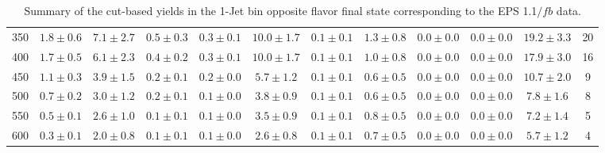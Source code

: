 \begin{table}[!hb]
{\begin{center}
\begin{tabular}{l c c c c c c c c c c c }
350 & $1.8\pm0.6$ & $7.1\pm2.7$ & $0.5\pm0.3$ & $0.3\pm0.1$ & $10.0\pm1.7$ & $0.1\pm0.1$ & $1.3\pm0.8$ & $0.0\pm0.0$ & $0.0\pm0.0$ & $19.2\pm3.3$ & 20 \\
400 & $1.7\pm0.5$ & $6.1\pm2.3$ & $0.4\pm0.2$ & $0.3\pm0.1$ & $10.0\pm1.7$ & $0.1\pm0.1$ & $1.0\pm0.8$ & $0.0\pm0.0$ & $0.0\pm0.0$ & $17.9\pm3.0$ & 16 \\
450 & $1.1\pm0.3$ & $3.9\pm1.5$ & $0.2\pm0.1$ & $0.2\pm0.0$ & $5.7\pm1.2$ & $0.1\pm0.1$ & $0.6\pm0.5$ & $0.0\pm0.0$ & $0.0\pm0.0$ & $10.7\pm2.0$ & 9 \\
500 & $0.7\pm0.2$ & $3.0\pm1.2$ & $0.2\pm0.1$ & $0.1\pm0.0$ & $3.8\pm0.9$ & $0.1\pm0.1$ & $0.6\pm0.5$ & $0.0\pm0.0$ & $0.0\pm0.0$ & $7.8\pm1.6$ & 8 \\
550 & $0.5\pm0.1$ & $2.6\pm1.0$ & $0.1\pm0.1$ & $0.1\pm0.0$ & $3.5\pm0.9$ & $0.1\pm0.1$ & $0.8\pm0.5$ & $0.0\pm0.0$ & $0.0\pm0.0$ & $7.2\pm1.4$ & 5 \\
600 & $0.3\pm0.1$ & $2.0\pm0.8$ & $0.1\pm0.1$ & $0.1\pm0.0$ & $2.6\pm0.8$ & $0.1\pm0.1$ & $0.7\pm0.5$ & $0.0\pm0.0$ & $0.0\pm0.0$ & $5.7\pm1.2$ & 4 \\
\hline
\end{tabular}
\end{center}
}
\caption{Summary of the cut-based yields in the 1-Jet bin opposite flavor final state corresponding to the EPS 1.1$/fb$ data.}
\end{table}
